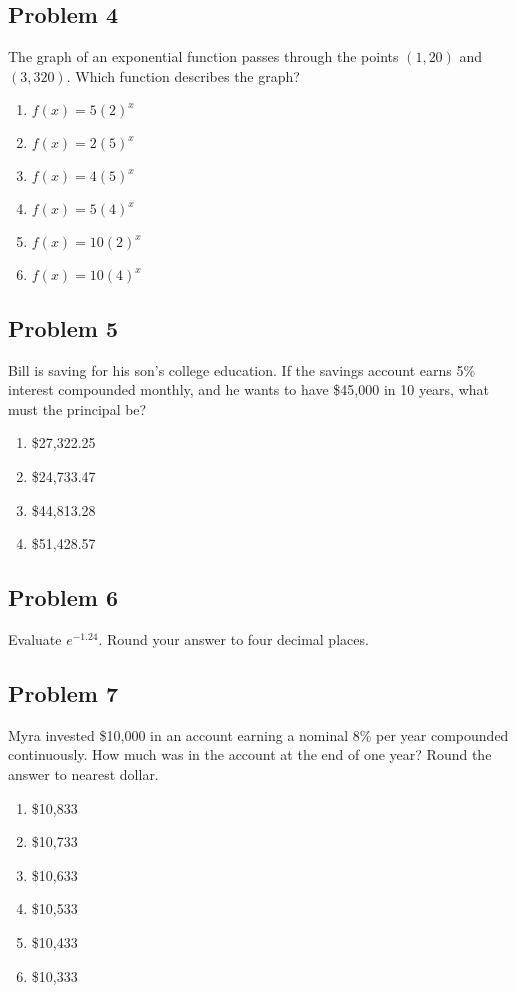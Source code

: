 \documentclass[12pt]{article}
\begin{document}
\subsection*{Problem 4}
The graph of an exponential function passes through the points \( (1, 20) \) and \( (3, 320) \). Which function describes the graph?

\begin{enumerate}[label=(\alph*)]
    \item \( f(x) = 5(2)^x \)
    \item \( f(x) = 2(5)^x \)
    \item \( f(x) = 4(5)^x \)
    \item \( f(x) = 5(4)^x \)
    \item \( f(x) = 10(2)^x \)
    \item \( f(x) = 10(4)^x \)
\end{enumerate}

\subsection*{Problem 5}
Bill is saving for his son's college education. If the savings account earns 5\% interest compounded monthly, and he wants to have \$45{,}000 in 10 years, what must the principal be?

\begin{enumerate}[label=(\alph*)]
    \item \$27{,}322.25
    \item \$24{,}733.47
    \item \$44{,}813.28
    \item \$51{,}428.57
\end{enumerate}

\subsection*{Problem 6}
Evaluate \( e^{-1.24} \). Round your answer to four decimal places.


\subsection*{Problem 7}
Myra invested \$10{,}000 in an account earning a nominal 8\% per year compounded continuously. How much was in the account at the end of one year? Round the answer to nearest dollar.

\begin{enumerate}[label=(\alph*)]
    \item \$10{,}833
    \item \$10{,}733
    \item \$10{,}633
    \item \$10{,}533
    \item \$10{,}433
    \item \$10{,}333
\end{enumerate}
\end{document}
